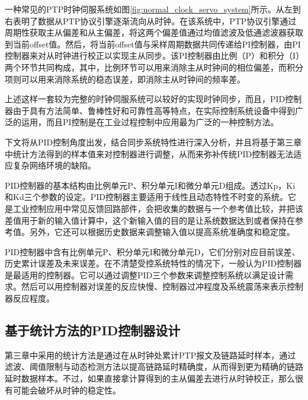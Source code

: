 一种常见的PTP时钟伺服系统如图\ref{fig:normal_clock_servo_system}所示\supercite{58}。从左到右表明了数据从PTP协议引擎逐渐流向从时钟。在该系统中，PTP协议引擎通过周期性获取主从偏差和从主偏差，将这两个偏差值通过均值滤波及低通滤波器获取到当前offset值。然后，将当前offset值与采样周期数据共同传递给PI控制器，由PI控制器来对从时钟进行校正以实现主从同步。该PI控制器由比例（P）和积分（I）两个环节共同构成，其中，比例环节可以用来消除主从时钟间的相位偏差，而积分项则可以用来消除系统的稳态误差，即消除主从时钟间的频率差\supercite{58}。

上述这样一套较为完整的时钟伺服系统可以较好的实现时钟同步，而且，PID控制器由于具有方法简单、鲁棒性好和可靠性高等特点，在实际控制系统设备中得到广泛的运用，而且PI控制是在工业过程控制中应用最为广泛的一种控制方法。

下文将从PID控制角度出发，结合同步系统特性进行深入分析，并且将基于第三章中统计方法得到的样本值来对控制器进行调整，从而来弥补传统PID控制器无法适应复杂网络环境的缺陷。

PID控制器的基本结构由比例单元P、积分单元I和微分单元D组成。透过Kp，Ki和Kd三个参数的设定。PID控制器主要适用于线性且动态特性不时变的系统。它是工业控制应用中常见反馈回路部件，会把收集的数据与一个参考值比较，并把该差值用于新的输入值计算中，这个新输入值的目的是让系统数据达到或者保持在参考值。另外，它还可以根据历史数据来调整输入值以提高系统准确度和稳定度。

PID控制器中含有比例单元P、积分单元I和微分单元D，它们分别对应目前误差、历史累计误差及未来误差。在不清楚受控系统特性的情况下，一般认为PID控制器是最适用的控制器。它可以通过调整PID三个参数来调整控制系统以满足设计需求。然后可以用控制器对误差的反应快慢、控制器过冲程度及系统震荡来表示控制器反应程度。


\subsection{基于统计方法的PID控制器设计}
第三章中采用的统计方法是通过在从时钟处累计PTP报文及链路延时样本，通过滤波、阈值限制与动态检测方法以提高链路延时精确度，从而得到更为精确的链路延时数据样本。不过，如果直接拿计算得到的主从偏差去进行从时钟校正，那么很有可能会破坏从时钟的稳定性。

